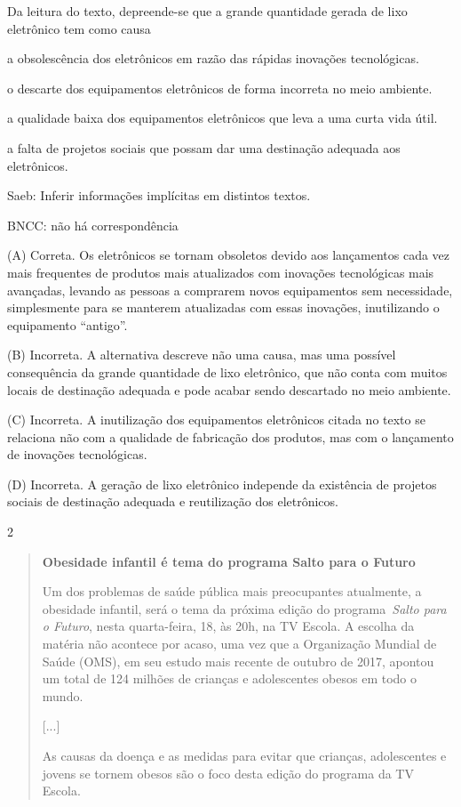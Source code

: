 
Da leitura do texto, depreende-se que a grande quantidade gerada de lixo
eletrônico tem como causa

\begin{escolha}
\item a obsolescência dos eletrônicos em razão das rápidas inovações
tecnológicas.

\item o descarte dos equipamentos eletrônicos de forma incorreta no meio
ambiente.

\item a qualidade baixa dos equipamentos eletrônicos que leva a uma curta
vida útil.

\item a falta de projetos sociais que possam dar uma destinação adequada
aos eletrônicos.
\end{escolha}

Saeb: Inferir informações implícitas em distintos textos.

BNCC: não há correspondência

(A) Correta. Os eletrônicos se tornam obsoletos devido aos lançamentos
cada vez mais frequentes de produtos mais atualizados com inovações
tecnológicas mais avançadas, levando as pessoas a comprarem novos
equipamentos sem necessidade, simplesmente para se manterem atualizadas
com essas inovações, inutilizando o equipamento ``antigo''.

(B) Incorreta. A alternativa descreve não uma causa, mas uma possível
consequência da grande quantidade de lixo eletrônico, que não conta com
muitos locais de destinação adequada e pode acabar sendo descartado no
meio ambiente.

(C) Incorreta. A inutilização dos equipamentos eletrônicos citada no
texto se relaciona não com a qualidade de fabricação dos produtos, mas
com o lançamento de inovações tecnológicas.

(D) Incorreta. A geração de lixo eletrônico independe da existência de
projetos sociais de destinação adequada e reutilização dos eletrônicos.

\num{2}

\begin{quote}
\textbf{Obesidade infantil é tema do programa Salto para o Futuro}

Um dos problemas de saúde pública mais preocupantes atualmente, a
obesidade infantil, será o tema da próxima edição do
programa~\emph{Salto para o Futuro}, nesta quarta-feira, 18, às 20h, na
TV Escola. A escolha da matéria não acontece por acaso, uma vez que a
Organização Mundial de Saúde (OMS), em seu estudo mais recente de
outubro de 2017, apontou um total de 124 milhões de crianças e
adolescentes obesos em todo o mundo.

{[}...{]}

As causas da doença e as medidas para evitar que crianças, adolescentes
e jovens se tornem obesos são o foco desta edição do programa da TV
Escola.
\end{quote}


